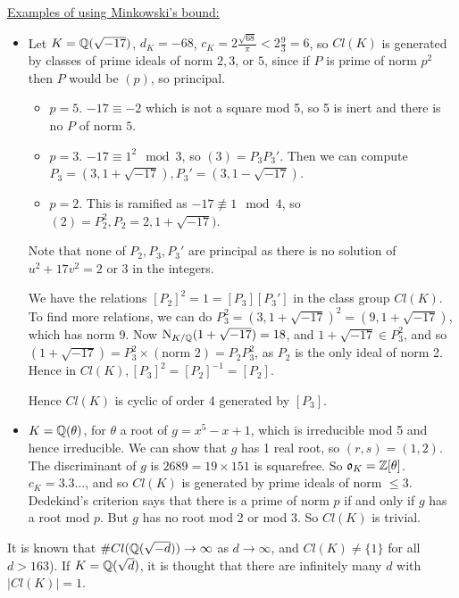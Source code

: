 \documentclass[10pt,a4paper]{article}
\begin{document}
\underline{Examples of using Minkowski's bound:}
\begin{itemize}
\item Let $K = \mathbb{Q}(\sqrt{-17})$, $d_K = -68$, $c_K = 2\frac{\sqrt{68}}{\pi}<2\frac{9}{3} = 6$, so $Cl(K)$ is generated by classes of prime ideals of norm $2,3$, or $5$, since if $P$ is prime of norm $p^2$ then $P$ would be $(p)$, so principal.

\begin{itemize}
\item $p=5$. $-17 \equiv -2$ which is not a square mod 5, so 5 is inert and there is no $P$ of norm $5$.
\item $p=3$. $-17 \equiv 1^2 \mod 3$, so $(3) = P_3P_3'$. Then we can compute $P_3 = (3, 1+\sqrt{-17}), P_3' = (3, 1-\sqrt{-17})$.
\item $p=2$. This is ramified as $-17 \nequiv 1 \mod 4$, so $(2) = P_2^2, P_2 = 2, 1+\sqrt{-17})$.
\end{itemize}
Note that none of $P_2, P_3, P_3'$ are principal as there is no solution of $u^2 + 17v^2 = 2$ or $3$ in the integers.

We have the relations $[P_2]^2 = 1 = [P_3][P_3']$ in the class group $Cl(K)$. To find more relations, we can do $P_3^2 = (3,1+\sqrt{-17})^2 = (9, 1+\sqrt{-17})$, which has norm 9. Now $\operatorname{N}_{K/\mathbb{Q}}(1+\sqrt{-17}) = 18$, and $1+\sqrt{-17} \in P_3^2$, and so $(1+\sqrt{-17}) = P_3^2 \times (\text{norm 2}) = P_2P_3^2$, as $P_2$ is the only ideal of norm 2. Hence in $Cl(K), [P_3]^2 = [P_2]^{-1} = [P_2]$. 

Hence $Cl(K)$ is cyclic of order 4 generated by $[P_3]$.

\item $K = \mathbb{Q}(\theta)$, for $\theta$ a root of $g = x^5 - x+1$, which is irreducible mod 5 and hence irreducible. We can show that $g$ has 1 real root, so $(r,s) = (1,2)$. The discriminant of $g$ is $2689 = 19\times 151$ is squarefree. So $\mathfrak{o}_K = \mathbb{Z}[\theta]$. $c_K = 3.3\ldots$, and so $Cl(K)$ is generated by prime ideals of norm $\leq 3$. Dedekind's criterion says that there is a prime of norm $p$ if and only if $g$ has a root mod $p$. But $g$ has no root mod 2 or mod 3. So $Cl(K)$ is trivial.
\end{itemize}
It is known that $\#Cl(\mathbb{Q}(\sqrt{-d})) \to \infty$ as $d \to \infty$, and $Cl(K) \neq \{1\}$ for all $d > 163$). If $K = \mathbb{Q}(\sqrt{d})$, it is thought that there are infinitely many $d$ with $|Cl(K)| = 1$.
\end{document}
